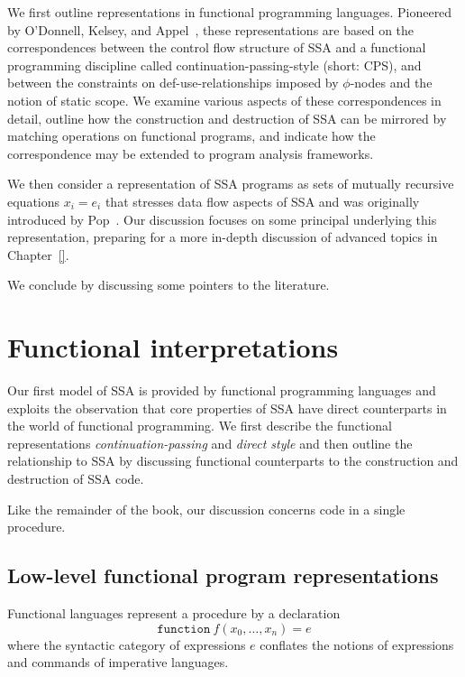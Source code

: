 We first outline representations in functional programming languages.
Pioneered by O'Donnell, Kelsey, and
Appel~\cite{ODonnellPhD,Kelsey95,Appel98:SSA}, these representations
are based on the correspondences between the control flow structure of
SSA and a functional programming discipline called
continuation-passing-style (short: CPS), and between the constraints
on def-use-relationships imposed by $\phi$-nodes and the notion of
static scope. We examine various aspects of these correspondences in
detail, outline how the construction and destruction of SSA can be
mirrored by matching operations on functional programs, and indicate
how the correspondence may be extended to program analysis frameworks.

We then consider a representation of SSA programs as sets of mutually
recursive equations $x_i = e_i$ that stresses data flow aspects of SSA
and was originally introduced by Pop~\cite{PopJS2007}.  Our discussion
focuses on some principal underlying this representation, preparing
for a more in-depth discussion of advanced topics in Chapter~\ref{}.

We conclude by discussing some pointers to the literature.

\section{Functional interpretations}
\label{section:Part1:Semantics:FunctionalLanguages}

Our first model of SSA is provided by functional programming languages
and exploits the observation that core properties of SSA have direct
counterparts in the world of functional programming.  We first
describe  the functional representations
\emph{continuation-passing} and \emph{direct style} and then outline
the relationship to SSA by discussing functional counterparts to the
construction and destruction of SSA code.

Like the remainder of the book, our discussion concerns code in a
single procedure.

\subsection{Low-level functional program representations}
\label{section:Part1:Semantics:LowLevelReps}

Functional languages represent a procedure by a declaration
$$\mathtt{function}\ f(x_0, \ldots, x_n) = e$$ where the syntactic
category of expressions $e$ conflates the notions of expressions and
commands of imperative languages.

